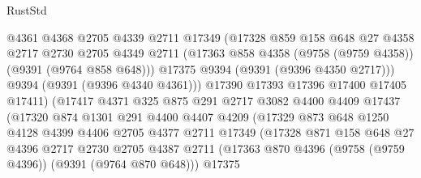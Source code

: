 \begin{lexlean}{RustStd}
\begin{coremodule}
                            @4361
                            @4368
                            @2705
                            @4339
                            @2711
                            @17349
                            (@17328
                              @859
                              @158
                              @648
                              @27
                              @4358
                              @2717
                              @2730
                              @2705
                              @4349
                              @2711
                              (@17363 @858 @4358 (@9758 (@9759 @4358)) (@9391 (@9764 @858 @648)))
                              @17375
                              @9394
                              (@9391 (@9396 @4350 @2717)))
                            @9394
                            (@9391 (@9396 @4340 @4361)))
                          @17390
                          @17393
                          @17396
                          @17400
                          @17405
                          @17411)
                        (@17417
                          @4371
                          @325
                          @875
                          @291
                          @2717
                          @3082
                          @4400
                          @4409
                          @17437
                          (@17320
                            @874
                            @1301
                            @291
                            @4400
                            @4407
                            @4209
                            (@17329
                              @873
                              @648
                              @1250
                              @4128
                              @4399
                              @4406
                              @2705
                              @4377
                              @2711
                              @17349
                              (@17328
                                @871
                                @158
                                @648
                                @27
                                @4396
                                @2717
                                @2730
                                @2705
                                @4387
                                @2711
                                (@17363 @870 @4396 (@9758 (@9759 @4396)) (@9391 (@9764 @870 @648)))
                                @17375

\end{coremodule}
\end{lexlean}
